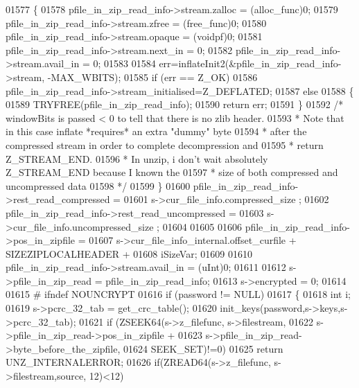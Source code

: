 \begin{DoxyCode}
01577     \{
01578       pfile\_in\_zip\_read\_info->stream.zalloc = (alloc\_func)0;
01579       pfile\_in\_zip\_read\_info->stream.zfree = (free\_func)0;
01580       pfile\_in\_zip\_read\_info->stream.opaque = (voidpf)0;
01581       pfile\_in\_zip\_read\_info->stream.next\_in = 0;
01582       pfile\_in\_zip\_read\_info->stream.avail\_in = 0;
01583 
01584       err=inflateInit2(&pfile\_in\_zip\_read\_info->stream, -MAX\_WBITS);
01585       \textcolor{keywordflow}{if} (err == Z\_OK)
01586         pfile\_in\_zip\_read\_info->stream\_initialised=Z\_DEFLATED;
01587       \textcolor{keywordflow}{else}
01588       \{
01589         TRYFREE(pfile\_in\_zip\_read\_info);
01590         \textcolor{keywordflow}{return} err;
01591       \}
01592         \textcolor{comment}{/* windowBits is passed < 0 to tell that there is no zlib header.}
01593 \textcolor{comment}{         * Note that in this case inflate *requires* an extra "dummy" byte}
01594 \textcolor{comment}{         * after the compressed stream in order to complete decompression and}
01595 \textcolor{comment}{         * return Z\_STREAM\_END.}
01596 \textcolor{comment}{         * In unzip, i don't wait absolutely Z\_STREAM\_END because I known the}
01597 \textcolor{comment}{         * size of both compressed and uncompressed data}
01598 \textcolor{comment}{         */}
01599     \}
01600     pfile\_in\_zip\_read\_info->rest\_read\_compressed =
01601             s->cur\_file\_info.compressed\_size ;
01602     pfile\_in\_zip\_read\_info->rest\_read\_uncompressed =
01603             s->cur\_file\_info.uncompressed\_size ;
01604 
01605 
01606     pfile\_in\_zip\_read\_info->pos\_in\_zipfile =
01607             s->cur\_file\_info\_internal.offset\_curfile + SIZEZIPLOCALHEADER +
01608               iSizeVar;
01609 
01610     pfile\_in\_zip\_read\_info->stream.avail\_in = (uInt)0;
01611 
01612     s->pfile\_in\_zip\_read = pfile\_in\_zip\_read\_info;
01613                 s->encrypted = 0;
01614 
01615 \textcolor{preprocessor}{#    ifndef NOUNCRYPT}
01616     \textcolor{keywordflow}{if} (password != NULL)
01617     \{
01618         \textcolor{keywordtype}{int} i;
01619         s->pcrc\_32\_tab = get\_crc\_table();
01620         init\_keys(password,s->keys,s->pcrc\_32\_tab);
01621         \textcolor{keywordflow}{if} (ZSEEK64(s->z\_filefunc, s->filestream,
01622                   s->pfile\_in\_zip\_read->pos\_in\_zipfile +
01623                      s->pfile\_in\_zip\_read->byte\_before\_the\_zipfile,
01624                   SEEK\_SET)!=0)
01625             \textcolor{keywordflow}{return} UNZ\_INTERNALERROR;
01626         \textcolor{keywordflow}{if}(ZREAD64(s->z\_filefunc, s->filestream,source, 12)<12)

\end{DoxyCode}
